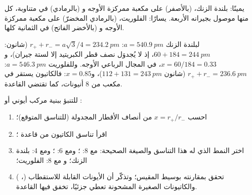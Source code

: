 \begin{omfigure}

{\small يمينًا: بلندة الزنك،  (بالأصفر) على  مكعبة ممركزة الأوجه
و (بالرمادي) في  متناوبة، كل منها موصول بجيرانه
الأربعة. يسارًا: الفلوريت،  (بالرمادي المخضرّ) على  مكعبة
ممركزة الأوجه و (بالأخضر الفاتح) في  الثمانية كلها.}
\end{omfigure}

\begin{example}\label{ex:b1:crystals-ionic-covalent:zns}
لبلندة الزنك $a = \qty{540.9}{pm}$: $r_+ + r_- = a\sqrt3/4 =
\qty{234.2}{pm}$ (شانون: $60 + 184 = \qty{244}{pm}$، إذ لا يُجدوَل نصف قطر
الكبريتيد إلا لستة جيران)، و$x = 60/184 = 0.33$، في
المجال الرباعي الأوجه. وللفلوريت $a = \qty{546.3}{pm}$: $r_+ + r_- =
\qty{236.6}{pm}$ (شانون $112 + 131 = \qty{243}{pm}$)، و$x = 0.85$:
فالكاتيون يستقر في مكعب من 8 أنيونات، كما تقتضي القاعدة.
\end{example}

\begin{method}\label{met:b1:crystals-ionic-covalent:predict}
للتنبؤ ببنية مركب أيوني  أو :
\begin{enumerate}
  \item احسب $x = r_+/r_-$ من أنصاف الأقطار المجدولة (للتناسق
        المتوقع)؛
  \item اقرأ تناسق الكاتيون من قاعدة ؛
  \item اختر النمط الذي له هذا التناسق والصيغة الصحيحة:
         مع 8: ؛ ومع 6: ؛ ومع 4: بلندة الزنك؛
        و مع 8: الفلوريت؛
  \item تحقق بمقارنته بوسيط  المقيس؛ وتذكّر أن
        الأيونات القابلة للاستقطاب (، ) والكاتيونات الصغيرة المشحونة
        تعطي  جزئيًا، تخفق فيها القاعدة.
\end{enumerate}
\end{method}

